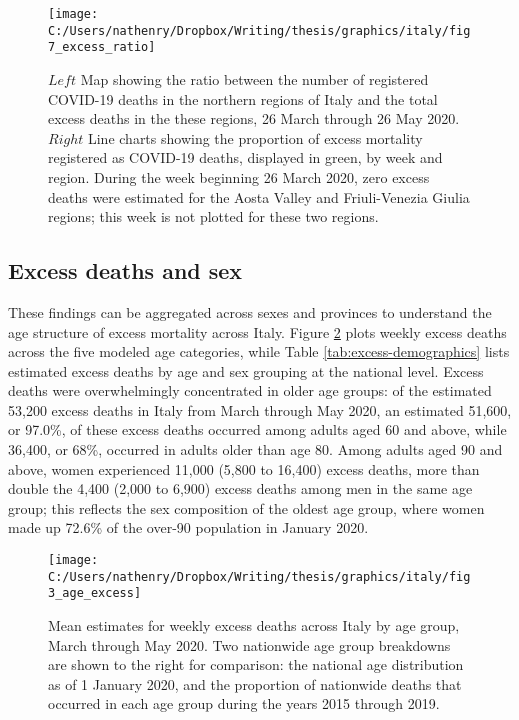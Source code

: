 \documentclass[
]{article}
\begin{document}
\begin{figure}[!hbt]

{\centering \texttt{[image: C:/Users/nathenry/Dropbox/Writing/thesis/graphics/italy/fig7\_excess\_ratio]} 

}

\caption{\(Left\) Map showing the ratio between the number of registered COVID-19 deaths in the northern regions of Italy and the total excess deaths in the these regions, 26 March through 26 May 2020. \(Right\) Line charts showing the proportion of excess mortality registered as COVID-19 deaths, displayed in green, by week and region. During the week beginning 26 March 2020, zero excess deaths were estimated for the Aosta Valley and Friuli-Venezia Giulia regions; this week is not plotted for these two regions.}\label{fig:excess-ratio}
\end{figure}

\hypertarget{excess-deaths-and-sex}{%
\subsection{Excess deaths and sex}\label{excess-deaths-and-sex}}

These findings can be aggregated across sexes and provinces to understand the age structure of excess mortality across Italy. Figure \ref{fig:age-excess} plots weekly excess deaths across the five modeled age categories, while Table \ref{tab:excess-demographics} lists estimated excess deaths by age and sex grouping at the national level. Excess deaths were overwhelmingly concentrated in older age groups: of the estimated 53,200 excess deaths in Italy from March through May 2020, an estimated 51,600, or 97.0\%, of these excess deaths occurred among adults aged 60 and above, while 36,400, or 68\%, occurred in adults older than age 80. Among adults aged 90 and above, women experienced 11,000 (5,800 to 16,400) excess deaths, more than double the 4,400 (2,000 to 6,900) excess deaths among men in the same age group; this reflects the sex composition of the oldest age group, where women made up 72.6\% of the over-90 population in January 2020.

\begin{figure}[!hbt]

{\centering \texttt{[image: C:/Users/nathenry/Dropbox/Writing/thesis/graphics/italy/fig3\_age\_excess]} 

}

\caption{Mean estimates for weekly excess deaths across Italy by age group, March through May 2020. Two nationwide age group breakdowns are shown to the right for comparison: the national age distribution as of 1 January 2020, and the proportion of nationwide deaths that occurred in each age group during the years 2015 through 2019.}\label{fig:age-excess}
\end{figure}
\end{document}
